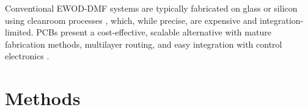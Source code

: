 \documentclass{Notes}
\begin{document}
Conventional EWOD-DMF systems are typically fabricated on glass or silicon using cleanroom processes \cite{vafaieNumericalSimulationEWOD2019}, which, while precise, are expensive and integration-limited. PCBs present a cost-effective, scalable alternative with mature fabrication methods, multilayer routing, and easy integration with control electronics \cite{jiangongDirectreferencingTwodimensionalarrayDigital2008,sukthangRapidFabricationCloseTyped2020,yiDesignOpenElectrowetting2020}.

\chapter{Methods}

\backmatter


\end{document}
